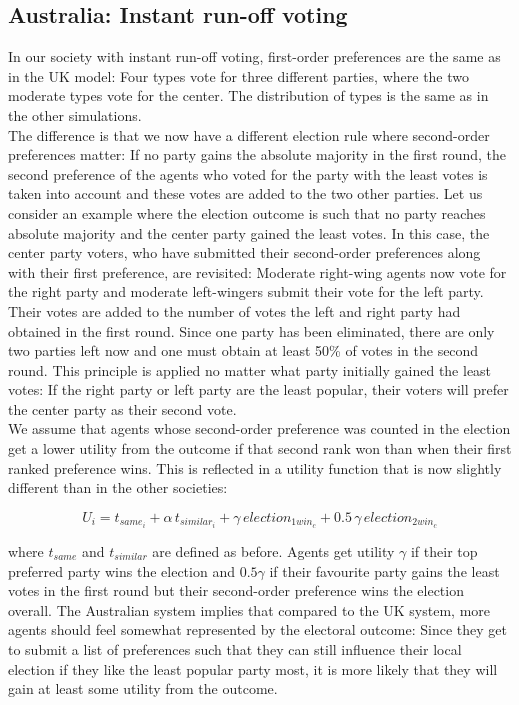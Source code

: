 \documentclass[12pt, a4paper]{article}
\begin{document}
	
	\subsection{Australia: Instant run-off voting} 
	In our society with instant run-off voting, first-order preferences are the same as in the UK model: Four types vote for three different parties, where the two moderate types vote for the center. The distribution of types is the same as in the other simulations. \\
	The difference is that we now have a different election rule where second-order preferences matter: If no party gains the absolute majority in the first round, the second preference of the agents who voted for the party with the least votes is taken into account and these votes are added to the two other parties. Let us consider an example where the election outcome is such that no party reaches absolute majority and the center party gained the least votes. In this case, the center party voters, who have submitted their second-order preferences along with their first preference, are revisited: Moderate right-wing agents now vote for the right party and moderate left-wingers submit their vote for the left party. Their votes are added to the number of votes the left and right party had obtained in the first round. Since one party has been eliminated, there are only two parties left now and one must obtain at least 50\% of votes in the second round. This principle is applied no matter what party initially gained the least votes: If the right party or left party are the least popular, their voters will prefer the center party as their second vote. \\
	We assume that agents whose second-order preference was counted in the election get a lower utility from the outcome if that second rank won than when their first ranked preference wins. This is reflected in a utility function that is now slightly different than in the other societies:
	
	\begin{equation}
	U_i=t_{same_i}+\alpha \, t_{similar_i}+\gamma \, election_{1win_c} + 0.5 \, \gamma \, election_{2win_c}
	\end{equation}
	
	where $t_{same}$ and $t_{similar}$ are defined as before. Agents get utility $\gamma$ if their top preferred party wins the election and $0.5 \gamma$ if their favourite party gains the least votes in the first round but their second-order preference wins the election overall.
	The Australian system implies that compared to the UK system, more agents should feel somewhat represented by the electoral outcome: Since they get to submit a list of preferences such that they can still influence their local election if they like the least popular party most, it is more likely that they will gain at least some utility from the outcome.
	
\end{document}
